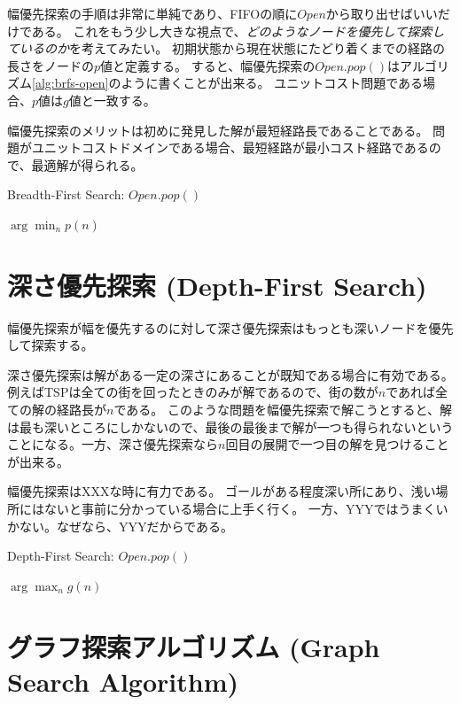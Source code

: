 \documentclass{report}
\begin{document}
幅優先探索の手順は非常に単純であり、FIFOの順に$Open$から取り出せばいいだけである。
これをもう少し大きな視点で、{\it どのようなノードを優先して探索しているのか}を考えてみたい。
初期状態から現在状態にたどり着くまでの経路の長さをノードの$p$値と定義する。
すると、幅優先探索の$Open.pop()$はアルゴリズム\ref{alg:brfs-open}のように書くことが出来る。
ユニットコスト問題である場合、$p$値は$g$値と一致する。

幅優先探索のメリットは初めに発見した解が最短経路長であることである。
問題がユニットコストドメインである場合、最短経路が最小コスト経路であるので、最適解が得られる。

\begin{algorithm}
\caption{Breadth-First Search: $Open.pop()$}
\label{alg:brfs-open}
	\Return $\arg \min_n p(n)$
\end{algorithm}

\section{深さ優先探索 (Depth-First Search)}
\label{sec:depth-first-search}

幅優先探索が幅を優先するのに対して深さ優先探索はもっとも深いノードを優先して探索する。

深さ優先探索は解がある一定の深さにあることが既知である場合に有効である。
例えばTSPは全ての街を回ったときのみが解であるので、街の数が$n$であれば全ての解の経路長が$n$である。
このような問題を幅優先探索で解こうとすると、解は最も深いところにしかないので、最後の最後まで解が一つも得られないということになる。一方、深さ優先探索なら$n$回目の展開で一つ目の解を見つけることが出来る。

幅優先探索はXXXな時に有力である。
ゴールがある程度深い所にあり、浅い場所にはないと事前に分かっている場合に上手く行く。
一方、YYYではうまくいかない。なぜなら、YYYだからである。

\begin{algorithm}
\caption{Depth-First Search: $Open.pop()$}
\label{alg:dfs-open}
	\Return $\arg \max_n g(n)$
\end{algorithm}


\section{グラフ探索アルゴリズム (Graph Search Algorithm)}
\label{sec:graph-search-algorithm}
\end{document}
